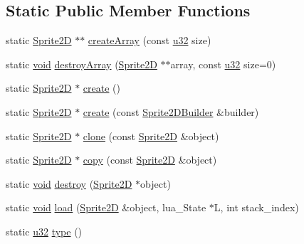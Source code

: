 \subsection*{Static Public Member Functions}
\begin{DoxyCompactItemize}
\item 
static \mbox{\hyperlink{classnjli_1_1_sprite2_d}{Sprite2D}} $\ast$$\ast$ \mbox{\hyperlink{classnjli_1_1_sprite2_d_a75bf99fa3eeaff0c3ce8b526da172690}{create\+Array}} (const \mbox{\hyperlink{_util_8h_a10e94b422ef0c20dcdec20d31a1f5049}{u32}} size)
\item 
static \mbox{\hyperlink{_thread_8h_af1e856da2e658414cb2456cb6f7ebc66}{void}} \mbox{\hyperlink{classnjli_1_1_sprite2_d_a4b91a7652df3f55fe8ce1c309c273438}{destroy\+Array}} (\mbox{\hyperlink{classnjli_1_1_sprite2_d}{Sprite2D}} $\ast$$\ast$array, const \mbox{\hyperlink{_util_8h_a10e94b422ef0c20dcdec20d31a1f5049}{u32}} size=0)
\item 
static \mbox{\hyperlink{classnjli_1_1_sprite2_d}{Sprite2D}} $\ast$ \mbox{\hyperlink{classnjli_1_1_sprite2_d_a93ea0b2082fb0be44e226f0a75cb1280}{create}} ()
\item 
static \mbox{\hyperlink{classnjli_1_1_sprite2_d}{Sprite2D}} $\ast$ \mbox{\hyperlink{classnjli_1_1_sprite2_d_a36d602af7f4cc35c181e5cd89aeaf1e5}{create}} (const \mbox{\hyperlink{classnjli_1_1_sprite2_d_builder}{Sprite2\+D\+Builder}} \&builder)
\item 
static \mbox{\hyperlink{classnjli_1_1_sprite2_d}{Sprite2D}} $\ast$ \mbox{\hyperlink{classnjli_1_1_sprite2_d_a74e12714eebdca602203dc3f1570c307}{clone}} (const \mbox{\hyperlink{classnjli_1_1_sprite2_d}{Sprite2D}} \&object)
\item 
static \mbox{\hyperlink{classnjli_1_1_sprite2_d}{Sprite2D}} $\ast$ \mbox{\hyperlink{classnjli_1_1_sprite2_d_a8a4d39bc4949de3339c0cc9adb584a12}{copy}} (const \mbox{\hyperlink{classnjli_1_1_sprite2_d}{Sprite2D}} \&object)
\item 
static \mbox{\hyperlink{_thread_8h_af1e856da2e658414cb2456cb6f7ebc66}{void}} \mbox{\hyperlink{classnjli_1_1_sprite2_d_a7ee4f6b5135262c0ea30f46a51b3c7a8}{destroy}} (\mbox{\hyperlink{classnjli_1_1_sprite2_d}{Sprite2D}} $\ast$object)
\item 
static \mbox{\hyperlink{_thread_8h_af1e856da2e658414cb2456cb6f7ebc66}{void}} \mbox{\hyperlink{classnjli_1_1_sprite2_d_aba38ac28f9b1b82a4afeb04c088c212d}{load}} (\mbox{\hyperlink{classnjli_1_1_sprite2_d}{Sprite2D}} \&object, lua\+\_\+\+State $\ast$L, int stack\+\_\+index)
\item 
static \mbox{\hyperlink{_util_8h_a10e94b422ef0c20dcdec20d31a1f5049}{u32}} \mbox{\hyperlink{classnjli_1_1_sprite2_d_a2a55a0a9a9d32af30b6bf0c7f52d146e}{type}} ()
\end{DoxyCompactItemize}
